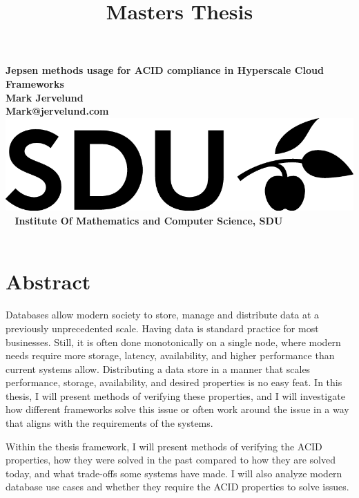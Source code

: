\documentclass[a4paper,10pt,titlepage]{report}
\date{}
\title{Masters Thesis}
\begin{document}
\begin{titlepage}
\centering
    \vspace*{9\baselineskip}
    \huge
    \bfseries
    Jepsen methods usage for ACID compliance in Hyperscale Cloud Frameworks \\
    \normalfont
    Mark Jervelund \\
    Mark@jervelund.com \\
    \vspace*{9\baselineskip}
    \normalfont
	\includegraphics[scale=1]{logos/SDU_BLACK.png}
    \vfill\
    \vspace{5mm}
    Institute Of Mathematics and Computer Science, SDU \\

    \textbf{\datedate} \\[2\baselineskip]
\end{titlepage}

\renewcommand{\thepage}{\roman{page}}%
\tableofcontents
\newpage
\setcounter{page}{1}
\renewcommand{\thepage}{\arabic{page}}


\section*{Abstract}

Databases allow modern society to store, manage and distribute data at a previously unprecedented scale. Having data is standard practice for most businesses. Still, it is often done monotonically on a single node, where modern needs require more  storage, latency, availability, and higher performance than current systems allow. Distributing a data store in a manner that scales performance, storage, availability, and desired properties is no easy feat. In this thesis, I will present methods of verifying these properties, and I will investigate how different frameworks solve this issue or often work around the issue in a way that aligns with the requirements of the systems. \\
\vspace{5mm}

Within the thesis framework, I will present methods of verifying the ACID properties, how they were solved in the past compared to how they are solved today, and what trade-offs some systems have made. I will also analyze modern database use cases and whether they require the ACID properties to solve issues.\\
\vspace{5mm}
\end{document}
